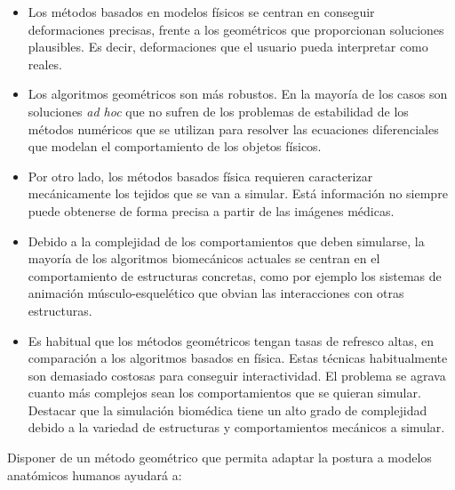\begin{itemize}
\item Los métodos basados en modelos físicos se centran en conseguir deformaciones precisas, frente a los geométricos que proporcionan soluciones plausibles. Es decir, deformaciones que el usuario pueda interpretar como reales. 


\item Los algoritmos geométricos son más robustos. En la mayoría de los casos son soluciones \emph{ad hoc} que no sufren de los problemas de estabilidad de los métodos numéricos que se utilizan para resolver las ecuaciones diferenciales que modelan el comportamiento de los objetos físicos. %

\item Por otro lado, los métodos basados física requieren caracterizar mecánicamente los tejidos que se van a simular. Está información no siempre puede obtenerse de forma precisa a partir de las imágenes médicas.

\item Debido a la complejidad de los comportamientos que deben simularse, la mayoría de los algoritmos biomecánicos actuales se centran en el comportamiento de estructuras concretas, como por ejemplo los sistemas de animación músculo-esquelético que obvian las interacciones con otras estructuras. 

\item Es habitual que los métodos geométricos tengan tasas de refresco altas, en comparación a los algoritmos basados en física. Estas técnicas habitualmente son demasiado costosas para conseguir interactividad. El problema se agrava  cuanto más complejos sean los comportamientos que se quieran simular. Destacar que la simulación biomédica tiene un alto grado de complejidad debido a la variedad de estructuras y comportamientos mecánicos a simular.

\end{itemize}

Disponer de un método geométrico que permita adaptar la postura a modelos anatómicos humanos ayudará a:

